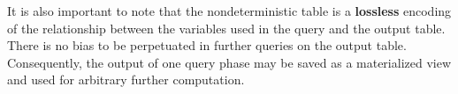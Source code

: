 It is also important to note that the nondeterministic table is a \textbf{lossless} encoding of the relationship between the variables used in the query and the output table.  There is no bias to be perpetuated in further queries on the output table.  Consequently, the output of one query phase may be saved as a materialized view and used for arbitrary further computation.
